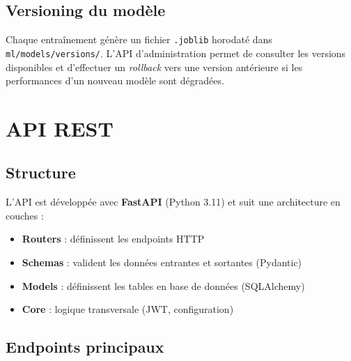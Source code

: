 \documentclass[12pt, a4paper]{article}
\begin{document}
\subsection{Versioning du modèle}

Chaque entraînement génère un fichier \texttt{.joblib} horodaté dans \texttt{ml/models/versions/}. L'API d'administration permet de consulter les versions disponibles et d'effectuer un \textit{rollback} vers une version antérieure si les performances d'un nouveau modèle sont dégradées.

\section{API REST}

\subsection{Structure}

L'API est développée avec \textbf{FastAPI} (Python 3.11) et suit une architecture en couches :

\begin{itemize}
    \item \textbf{Routers} : définissent les endpoints HTTP
    \item \textbf{Schemas} : valident les données entrantes et sortantes (Pydantic)
    \item \textbf{Models} : définissent les tables en base de données (SQLAlchemy)
    \item \textbf{Core} : logique transversale (JWT, configuration)
\end{itemize}

\subsection{Endpoints principaux}
\end{document}
